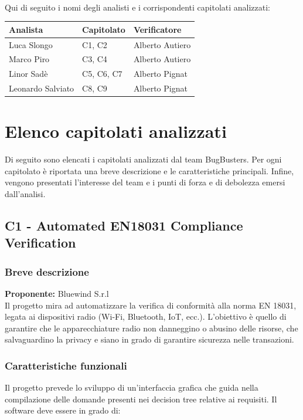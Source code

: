 \documentclass[a4paper,11pt]{article}
\begin{document}
\paragraph{}
Qui di seguito i nomi degli analisti e i corrispondenti capitolati analizzati:

\begin{tabularx}{\textwidth}{|X|X|X|}
\hline
\rowcolor{lightgray!40}
\textbf{Analista} & \textbf{Capitolato} & \textbf{Verificatore} \\
\hline
Luca Slongo & C1, C2 & Alberto Autiero\\ 
\hline
Marco Piro & C3, C4 & Alberto Autiero \\ 
\hline
Linor Sadè & C5, C6, C7 & Alberto Pignat\\ 
\hline
Leonardo Salviato & C8, C9 & Alberto Pignat\\ 
\hline
\end{tabularx}

\newpage
\section{Elenco capitolati analizzati}
\label{sec:elenco_capitolati}
Di seguito sono elencati i capitolati analizzati dal team BugBusters. Per ogni capitolato è riportata una breve descrizione e le caratteristiche principali. Infine, vengono presentati l'interesse del team e i punti di forza e di debolezza emersi dall'analisi.

\newpage
\subsection{C1 - Automated EN18031 Compliance Verification}
\subsubsection{Breve descrizione}
\textbf{Proponente:} Bluewind S.r.l
\vspace{0.5em}\\
Il progetto mira ad automatizzare la verifica di conformità alla norma EN 18031, legata ai dispositivi radio (Wi-Fi, Bluetooth, IoT, ecc.). L'obiettivo è quello di garantire che le apparecchiature radio non danneggino o abusino delle risorse, che salvaguardino la privacy e siano in grado di garantire sicurezza nelle transazioni.
\subsubsection{Caratteristiche funzionali}
Il progetto prevede lo sviluppo di un'interfaccia grafica che guida nella compilazione delle domande presenti nei decision tree relative ai requisiti. 
Il software deve essere in grado di:
\end{document}

